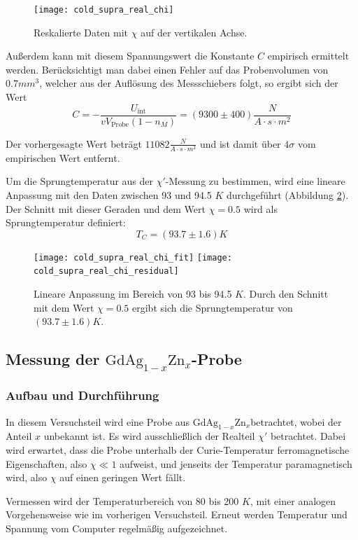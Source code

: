 \documentclass{../Misc/MontavonLaTeX/Montavon}
\newcommand{\gdagzn}{$\textrm{GdAg}_{1-x}\textrm{Zn}_x$}
\begin{document}
\begin{figure}[htbp]
\centering
\texttt{[image: cold\_supra\_real\_chi]}
\caption{Reskalierte Daten mit $\chi$ auf der vertikalen Achse.}
\label{fig:cold_supra_real_chi}
\end{figure}

Außerdem kann mit diesem Spannungswert die Konstante $C$ empirisch ermittelt werden. Berücksichtigt man dabei einen Fehler auf das Probenvolumen von $0.7 \unit{mm^3}$, welcher aus der Auflösung des Messschiebers folgt, so ergibt sich der Wert
\[
	C = - \frac{U_\textrm{int}}{v V_\textrm{Probe} (1-n_M)} = (9300 \pm 400)  \unit{\frac{N}{A \cdot s \cdot m^2}} 
\]

Der vorhergesagte Wert beträgt $11082 \unit{\frac{N}{A \cdot s \cdot m^2}}$ und ist damit über $4 \sigma$ vom empirischen Wert entfernt.

Um die Sprungtemperatur aus der $\chi'$-Messung zu bestimmen, wird eine lineare Anpassung mit den Daten zwischen 93 und 94.5 $\unit{K}$ durchgeführt (Abbildung \ref{fig:cold_supra_real_chi_fit}). Der Schnitt mit dieser Geraden und dem Wert $\chi = 0.5$ wird als Sprungtemperatur definiert:
\[
	T_C = (93.7 \pm 1.6) \unit{K}
\]

\begin{figure}[htbp]
\centering
\texttt{[image: cold\_supra\_real\_chi\_fit]}
\texttt{[image: cold\_supra\_real\_chi\_residual]}
\caption{Lineare Anpassung im Bereich von 93 bis 94.5 $\unit{K}$. Durch den Schnitt mit dem Wert $\chi = 0.5$ ergibt sich die Sprungtemperatur von $(93.7 \pm 1.6) \unit{K}$.}
\label{fig:cold_supra_real_chi_fit}
\end{figure}


\subsection{Messung der \gdagzn-Probe}
\subsubsection{Aufbau und Durchführung}
In diesem Versuchsteil wird eine Probe aus \gdagzn betrachtet, wobei der Anteil $x$ unbekannt ist. Es wird ausschließlich der Realteil $\chi'$ betrachtet. Dabei wird erwartet, dass die Probe unterhalb der Curie-Temperatur ferromagnetische Eigenschaften, also $\chi \ll 1$ aufweist, und jenseits der Temperatur paramagnetisch wird, also $\chi$ auf einen geringen Wert fällt.

Vermessen wird der Temperaturbereich von 80 bis 200 $\unit{K}$, mit einer analogen Vorgehensweise wie im vorherigen Versuchsteil. Erneut werden Temperatur und Spannung vom Computer regelmäßig aufgezeichnet.
\end{document}
